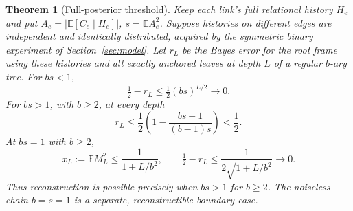 \documentclass[11pt,a4paper]{article}
\newtheorem{theorem}[definition]{Theorem}
\newcommand{\E}{\mathbb E}
\begin{document}
\begin{theorem}[Full-posterior threshold]\label{thm:fulltree}
Keep each link's full relational history $H_e$ and put $A_e=|\E[C_e\mid H_e]|$, $s=\E A_e^2$. Suppose histories on different edges are independent and identically distributed, acquired by the symmetric binary experiment of Section~\ref{sec:model}. Let $r_L$ be the Bayes error for the root frame using these histories and all exactly anchored leaves at depth $L$ of a regular $b$-ary tree. For $bs<1$,
\[
 \tfrac12-r_L\le\tfrac12(bs)^{L/2}\longrightarrow0.
\]
For $bs>1$, with $b\ge2$, at every depth
\[
 r_L\le\frac12\left(1-\frac{bs-1}{(b-1)s}\right)<\frac12.
\]
At $bs=1$ with $b\ge2$,
\[
 x_L:=\E M_L^2\le\frac1{1+L/b^2},\qquad
 \tfrac12-r_L\le\frac1{2\sqrt{1+L/b^2}}\longrightarrow0.
\]
Thus reconstruction is possible precisely when $bs>1$ for $b\ge2$. The noiseless chain $b=s=1$ is a separate, reconstructible boundary case.
\end{theorem}
\end{document}
